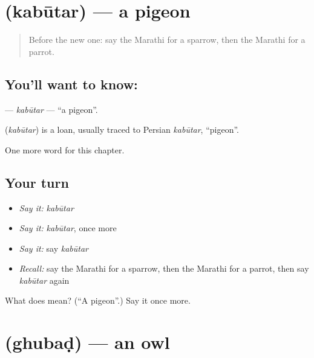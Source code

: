 \section[\texorpdfstring{\mr{कबूतर} (kabūtar)}{कबूतर (kabūtar)}]{ (kabūtar) — a pigeon}

\label{lesson:MR-C142-kabutar}



\begin{quote}
Before the new one: say the Marathi for a sparrow, then the Marathi for a parrot.
\end{quote}

\subsection*{You'll want to know: }
\textbf{} — \emph{kabūtar} — \textquotedblleft{}a pigeon\textquotedblright{}.

\begin{cousinweb}
\textbf{} (\emph{kabūtar}) is a loan, usually traced to Persian \emph{kabūtar}, \textquotedblleft{}pigeon\textquotedblright{}.
\end{cousinweb}

\begin{grammarlens}[title={What you've built}]
One more word for this chapter.
\end{grammarlens}

\subsection*{Your turn}
\begin{itemize}
\raggedright
  \item \emph{Say it:} \emph{kabūtar}
  \item \emph{Say it:} \emph{kabūtar}, once more
  \item \emph{Say it:} say \emph{kabūtar}
  \item \emph{Recall:} say the Marathi for a sparrow, then the Marathi for a parrot, then say \emph{kabūtar} again
\end{itemize}

\begin{tcolorbox}[breakable,colback=teal!4,colframe=teal!35!black,title={Before you move on}]
What does  mean? (\textquotedblleft{}A pigeon\textquotedblright{}.) Say it once more.
\end{tcolorbox}
\section[\texorpdfstring{\mr{घुबड} (ghubaḍ)}{घुबड (ghubaḍ)}]{ (ghubaḍ) — an owl}

